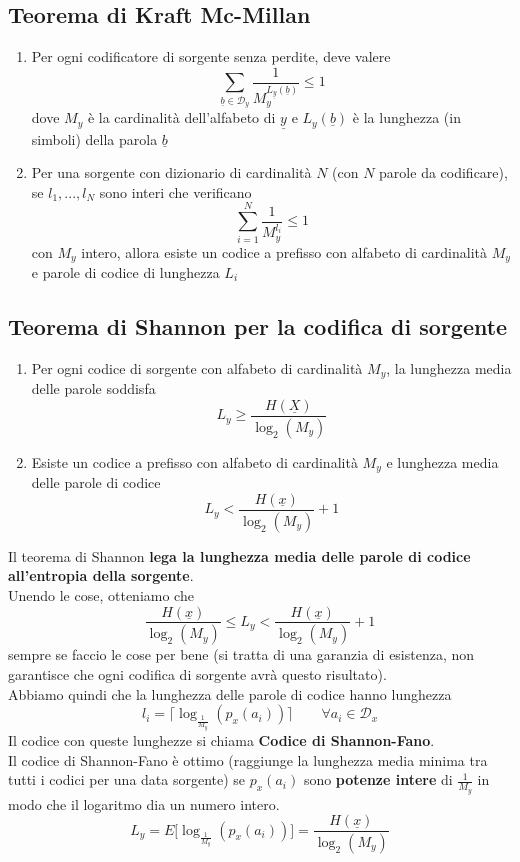 \documentclass{article}
\begin{document}
\subsection{Teorema di Kraft Mc-Millan}
\begin{enumerate}
	\item Per ogni codificatore di sorgente senza perdite, deve valere $$\sum_{\underline{b}\in\mathcal{D}_y}\frac{1}{M_y^{L_{\underline{y}}(\underline{b})}}\leq 1$$ dove $M_y$ è la cardinalità dell'alfabeto di $\underline{y}$ e $L_y(\underline{b})$ è la lunghezza (in simboli) della parola $\underline{b}$
	\item Per una sorgente con dizionario di cardinalità $N$ (con $N$ parole da codificare), se $l_1,...,l_N$ sono interi che verificano $$\sum_{i=1}^N\frac{1}{M_y^{l_i}}\leq 1$$ con $M_y$ intero, allora esiste un codice a prefisso con alfabeto di cardinalità $M_y$ e parole di codice di lunghezza $L_i$
\end{enumerate}

\subsection{Teorema di Shannon per la codifica di sorgente}
\begin{enumerate}
	\item Per ogni codice di sorgente con alfabeto di cardinalità $M_y$, la lunghezza media delle parole soddisfa $$L_y\geq \frac{H(\underline{X})}{\log_2(M_y)}$$
	\item Esiste un codice a prefisso con alfabeto di cardinalità $M_y$ e lunghezza media delle parole di codice $$L_y<\frac{H(\underline{x})}{\log_2(M_y)}+1$$
\end{enumerate}
Il teorema di Shannon \textbf{lega la lunghezza media delle parole di codice all'entropia della sorgente}.\\
Unendo le cose, otteniamo che $$\frac{H(\underline{x})}{\log_2(M_y)}\leq L_y<\frac{H(\underline{x})}{\log_2(M_y)}+1$$
sempre se faccio le cose per bene (si tratta di una garanzia di esistenza, non garantisce che ogni codifica di sorgente avrà questo risultato).\\
Abbiamo quindi che la lunghezza delle parole di codice hanno lunghezza $$l_i=\lceil\log_{\frac{1}{M_y}}(p_x(a_i))\rceil\qquad\forall a_i\in\mathcal{D}_x$$
Il codice con queste lunghezze si chiama \textbf{Codice di Shannon-Fano}.\\
Il codice di Shannon-Fano è ottimo (raggiunge la lunghezza media minima tra tutti i codici per una data sorgente) se $p_x(a_i)$ sono \textbf{potenze intere} di $\frac{1}{M_y}$ in modo che il logaritmo dia un numero intero.\\
$$L_y=E\big[\log_{\frac{1}{M_y}}(p_x(a_i))\big]=\frac{H(\underline{x})}{\log_2(M_y)}$$
\end{document}

